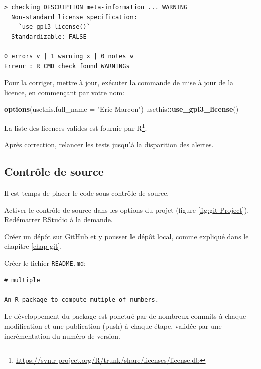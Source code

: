 \documentclass[
  12pt,
  french,
  a4paper,
  extrafontsizes,onecolumn,openright
  ]{memoir}
\newenvironment{Shaded}{\begin{snugshade}}{\end{snugshade}}
\newcommand{\AttributeTok}[1]{\textcolor[rgb]{0.13,0.29,0.53}{#1}}
\newcommand{\FunctionTok}[1]{\textcolor[rgb]{0.13,0.29,0.53}{\textbf{#1}}}
\newcommand{\NormalTok}[1]{#1}
\newcommand{\SpecialCharTok}[1]{\textcolor[rgb]{0.81,0.36,0.00}{\textbf{#1}}}
\newcommand{\StringTok}[1]{\textcolor[rgb]{0.31,0.60,0.02}{#1}}
\begin{document}
\begin{verbatim}
> checking DESCRIPTION meta-information ... WARNING
  Non-standard license specification:
    `use_gpl3_license()`
  Standardizable: FALSE

0 errors v | 1 warning x | 0 notes v
Erreur : R CMD check found WARNINGs
\end{verbatim}

Pour la corriger, mettre à jour, exécuter la commande de mise à jour de la licence, en commençant par votre nom:

\scriptsize

\begin{Shaded}
\begin{Highlighting}[]
\FunctionTok{options}\NormalTok{(}\AttributeTok{usethis.full\_name =} \StringTok{"Eric Marcon"}\NormalTok{)}
\NormalTok{usethis}\SpecialCharTok{::}\FunctionTok{use\_gpl3\_license}\NormalTok{()}
\end{Highlighting}
\end{Shaded}

\normalsize

La liste des licences valides est fournie par R\footnote{\url{https://svn.r-project.org/R/trunk/share/licenses/license.db}}.

Après correction, relancer les tests jusqu'à la disparition des alertes.

\subsection{Contrôle de source}\label{sec:package-cds}

Il est temps de placer le code sous contrôle de source.

Activer le contrôle de source dans les options du projet (figure \ref{fig:git-Project}).
Redémarrer RStudio à la demande.

Créer un dépôt sur GitHub et y pousser le dépôt local, comme expliqué dans le chapitre \ref{chap-git}.

Créer le fichier \texttt{README.md}:

\begin{verbatim}
# multiple

An R package to compute mutiple of numbers.
\end{verbatim}

Le développement du package est ponctué par de nombreux commits à chaque modification et une publication (push) à chaque étape, validée par une incrémentation du numéro de version.
\end{document}
